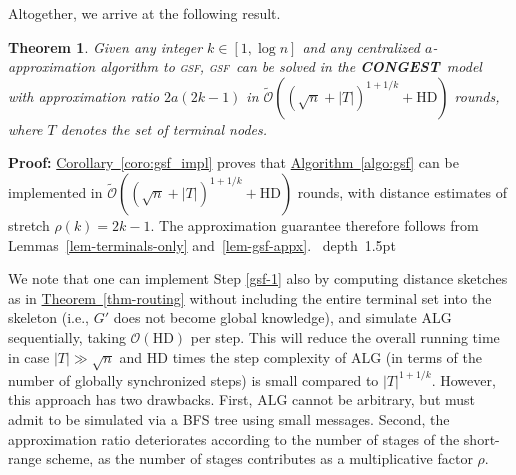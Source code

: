 \documentclass[letterpaper,11pt]{article}
\newcommand{\namedref}[2]{\hyperref[#2]{#1~\ref*{#2}}}
\newcommand{\theoremref}[1]{\namedref{Theorem}{#1}}
\newcommand{\corollaryref}[1]{\namedref{Corollary}{#1}}
\newcommand{\algref}[1]{\namedref{Algorithm}{#1}}
\newtheorem{theorem}{Theorem}[section]
\newcommand{\blackslug}{\hbox{\hskip 1pt \vrule width 4pt height 8pt
depth 1.5pt \hskip 1pt}}
\newcommand{\QED}{\quad\blackslug\lower 8.5pt\null\par}
\newenvironment{proof}[1][Proof:]{\noindent \textbf{#1}\xspace}{\QED}
\newcommand{\BO}{\mathcal{O}}
\newcommand{\CONGEST}{\textbf{CONGEST}}
\newcommand{\HD}{\mathrm{HD}}
\newcommand{\gsf}{\textsc{gsf}}
\newcommand{\ALG}{\mathrm{ALG}}
\begin{document}
Altogether, we arrive at the following result.
\begin{theorem}
Given any integer $k\in [1,\log n]$ and any centralized $a$-approximation
algorithm to \gsf, \gsf\ can be solved in the \CONGEST\ model with approximation
ratio $2a(2k-1)$ in $\tilde{\BO}((\sqrt{n}+|T|)^{1+1/k}+\HD)$ rounds, where $T$
denotes the set of terminal nodes.
\end{theorem}
\begin{proof}
\corollaryref{coro:gsf_impl} proves that \algref{algo:gsf} can be implemented in
$\tilde{\BO}((\sqrt{n}+|T|)^{1+1/k}+\HD)$ rounds, with distance estimates of
stretch $\rho(k)=2k-1$.
The approximation guarantee therefore follows from
Lemmas~\ref{lem-terminals-only} 
and~\ref{lem-gsf-appx}.
\end{proof}

We note that one can implement Step \ref{gsf-1} also by computing distance
sketches as in \theoremref{thm-routing} without including the entire terminal
set into the skeleton (i.e., $G'$ does not become global knowledge), and
simulate $\ALG$ sequentially, taking $\BO(\HD)$ per step. This will reduce the
overall running time in case $|T|\gg\sqrt{n}$ and $\HD$ times the step
complexity of $\ALG$ (in terms of the number of globally synchronized steps) is
small compared to $|T|^{1+1/k}$. However, this approach has two drawbacks. 
First, $\ALG$ cannot be arbitrary, but must admit to be simulated via a BFS tree
using small messages. Second, the approximation ratio deteriorates according to
the number of stages of the short-range scheme, as the number of stages
contributes as a multiplicative factor $\rho$.
\end{document}
